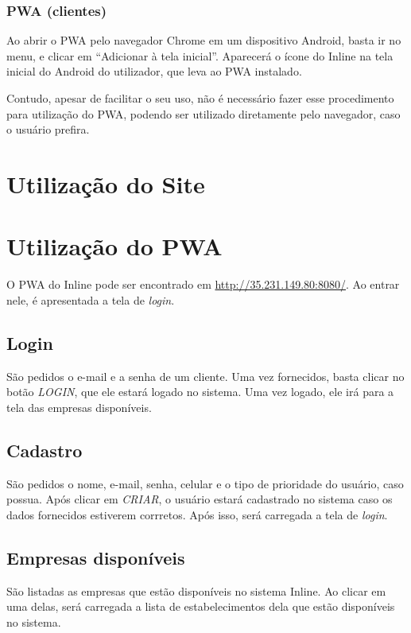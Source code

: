 \documentclass{book}
\begin{document}
\subsection{PWA (clientes)}
Ao abrir o PWA pelo navegador Chrome em um dispositivo Android, basta ir no
menu, e clicar em ``Adicionar à tela inicial''. Aparecerá o ícone do Inline
na tela inicial do Android do utilizador, que leva ao PWA instalado.

Contudo, apesar de facilitar o seu uso, não é necessário fazer esse procedimento
para utilização do PWA, podendo ser utilizado diretamente pelo navegador, caso o
usuário prefira.

\chapter{Utilização do Site}

\chapter{Utilização do PWA}

O PWA do Inline pode ser encontrado em \url{http://35.231.149.80:8080/}. Ao
entrar nele, é apresentada a tela de \textit{login}. 

\section{Login}

São pedidos o e-mail e a senha de um cliente. Uma vez fornecidos, basta clicar
no botão \textit{LOGIN}, que ele estará logado no sistema. Uma vez logado, ele
irá para a tela das empresas disponíveis.

\section{Cadastro}
São pedidos o nome, e-mail, senha, celular e o tipo de prioridade do usuário,
caso possua. Após clicar em \textit{CRIAR}, o usuário estará cadastrado no
sistema caso os dados fornecidos estiverem corrretos. Após isso, será carregada
a tela de \textit{login}.

\section{Empresas disponíveis}
São listadas as empresas que estão disponíveis no sistema Inline. Ao clicar em
uma delas, será carregada a lista de estabelecimentos dela que estão disponíveis
no sistema.
\end{document}
